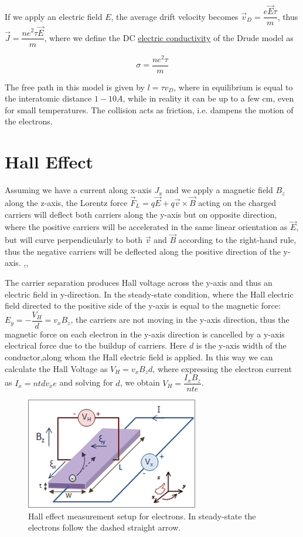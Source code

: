 \documentclass[openany,11pt,a4paper]{report}
\begin{document}
If we apply an electric field $E$, the average drift velocity becomes $\vec{v}_{D}= \dfrac{e\vec{E} \tau}{m}$, thus $\vec{J}=\dfrac{ne^{2}\tau \vec{E}}{m}$, where we define the DC \underline{electric conductivity} of the Drude model as

\begin{equation}
\sigma = \dfrac{ne^{2}\tau }{m}
\end{equation}

The free path in this model is given by $l= \tau v_{D}$, where in equilibrium is equal to the interatomic distance $1-10 A$, while in reality it can be up to a few cm, even for small temperatures. The collision acts as friction, i.e. dampens the motion of the electrons.


\section{Hall Effect}
Assuming we have a current along x-axis $J_{x}$ and we apply a magnetic field $B_{z}$ along the z-axis, the Lorentz force $\vec{F}_{L}= q\vec{E} + q\vec{v}\times \vec{B}$ acting on the charged carriers will deflect both carriers along the y-axis but on opposite direction, where the positive carriers will be accelerated in the same linear orientation as $\vec{E}$, but will curve perpendicularly to both $\vec{v}$ and $\vec{B}$ according to the right-hand rule, thus the negative carriers will be deflected along the positive direction of the y-axis. \cite{drude},\cite{appendix},\cite{lore} 

The carrier separation produces Hall voltage across the y-axis and thus an electric field in y-direction. In the steady-state condition, where the Hall electric field directed to the positive side of the y-axis is equal to the magnetic force: $E_{y}=-\dfrac{V_{H}}{d}=v_{x}B_{z}$, the carriers are not moving in the y-axis direction, thus the magnetic force on each electron in the y-axis direction is cancelled by a y-axis electrical force due to the buildup of carriers.\cite{hall} Here $d$ is the y-axis width of the conductor,along whom the Hall electric field is applied. In this way we can calculate the Hall Voltage as $V_{H}= v_{x} B_{z} d$, where expressing the electron current as $I_{x} = ntdv_{x}e$ and solving for $d$, we obtain $V_{H}=\dfrac{I_{x}B_{z}}{nte}$.

\begin{figure}[H]
\centering
\includegraphics[scale=1.2]{hall.png}
\caption{Hall effect measurement setup for electrons. In steady-state the electrons follow the dashed straight arrow.  \cite{hall}}
\end{figure}
\end{document}
